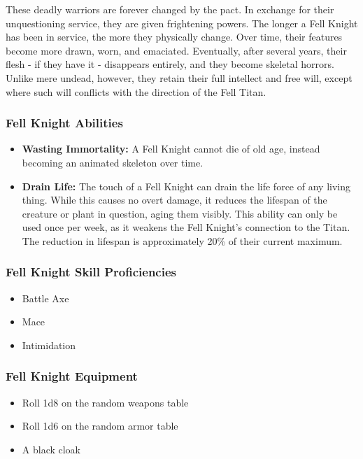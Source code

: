 \begin{multicols}{2}
These deadly warriors are forever changed by the pact. In exchange for
their unquestioning service, they are given frightening powers. The longer
a Fell Knight has been in service, the more they physically change. Over
time, their features become more drawn, worn, and emaciated. Eventually,
after several years, their flesh - if they have it - disappears entirely,
and they become skeletal horrors. Unlike mere undead, however, they retain
their full intellect and free will, except where such will conflicts with
the direction of the Fell Titan.

\subsubsection{Fell Knight Abilities}

\begin{itemize}
  \item \textbf{Wasting Immortality:} A Fell Knight cannot die of old age,
    instead becoming an animated skeleton over time.
  \item \textbf{Drain Life:} The touch of a Fell Knight can drain the life
    force of any living thing. While this causes no overt damage, it reduces
    the lifespan of the creature or plant in question, aging them visibly.
    This ability can only be used once per week, as it weakens the Fell
    Knight's connection to the Titan. The reduction in lifespan is
    approximately 20\% of their current maximum.
\end{itemize}

\subsubsection{Fell Knight Skill Proficiencies}

\begin{itemize}
  \item Battle Axe
  \item Mace
  \item Intimidation
\end{itemize}

\subsubsection{Fell Knight Equipment}

\begin{itemize}
  \item Roll 1d8 on the random weapons table
  \item Roll 1d6 on the random armor table
  \item A black cloak
\end{itemize}


\end{multicols}
